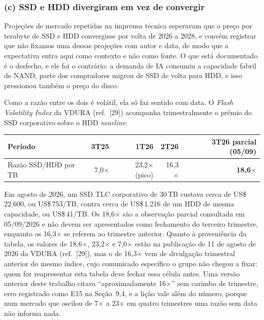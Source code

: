 \documentclass[11pt,a4paper]{article}
\begin{document}
\subsubsection*{(c) SSD e HDD divergiram em vez de convergir}

Projeções de mercado repetidas na imprensa técnica esperavam que o preço por terabyte de SSD e
HDD convergisse por volta de 2026 a 2028, e convém registrar que não fixamos uma dessas projeções com
autor e data, de modo que a expectativa entra aqui como contexto e não como fonte. O que está
documentado é o desfecho, e ele foi o contrário: a demanda de IA consumiu a capacidade fabril de
NAND, parte dos compradores migrou de SSD de volta para HDD, e isso pressionou também o preço do
disco.

Como a razão entre os dois é volátil, ela só faz sentido com data. O \emph{Flash Volatility Index} da
VDURA (ref.~[29]) acompanha trimestralmente o prêmio do SSD corporativo sobre o HDD \emph{nearline}:

\begin{center}\small
\begin{tabular}{@{}lrrrr@{}}
\toprule
\textbf{Período} & \textbf{3T25} & \textbf{1T26} & \textbf{2T26} & \textbf{3T26 parcial (05/09)} \\
\midrule
Razão SSD/HDD por TB & 7,0$\times$ & 23,2$\times$ (pico) & 16,3$\times$ & \textbf{18,6$\times$} \\
\bottomrule
\end{tabular}
\end{center}

Em agosto de 2026, um SSD TLC corporativo de 30\,TB custava cerca de US\$\,22.600, ou
US\$\,753/TB, contra cerca de US\$\,1.216 de um HDD de mesma capacidade, ou US\$\,41/TB. Os
18,6$\times$ são a observação parcial consultada em 05/09/2026 e não devem ser apresentados como
fechamento do terceiro trimestre, enquanto os 16,3$\times$ se referem ao trimestre anterior. Quanto à
proveniência da tabela, os valores de 18,6$\times$, 23,2$\times$ e 7,0$\times$ estão na publicação de
11 de agosto de 2026 da VDURA (ref.~[29]), mas o de 16,3$\times$ vem de divulgação trimestral
anterior do mesmo índice, cujo comunicado específico o grupo não chegou a fixar: quem for
reapresentar esta tabela deve fechar essa célula antes. Uma versão anterior deste trabalho citava
``aproximadamente 16$\times$'' sem carimbo de trimestre, erro registrado como E15 na Seção~9.4, e a
lição vale além do número, porque num mercado que oscilou de 7$\times$ a 23$\times$ em quatro
trimestres uma razão sem data não informa nada.
\end{document}
